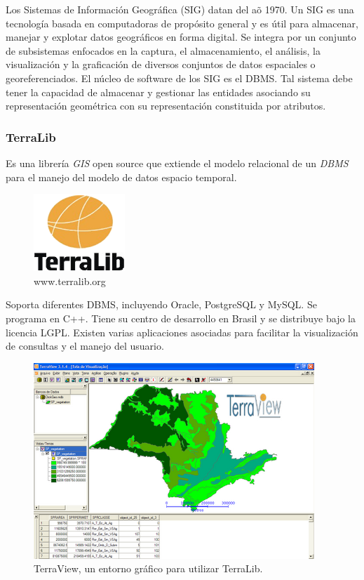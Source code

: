 \documentclass[a4paper,12pt,oneside]{report}
\begin{document}
Los Sistemas de Informaci\'on Geogr\'afica (SIG) datan del a\~o 1970. Un SIG es una tecnolog\'ia basada en computadoras de prop\'osito general y es \'util para almacenar, manejar y explotar datos geogr\'aficos en forma digital. Se integra por un conjunto de subsistemas enfocados en la captura, el almacenamiento, el an\'alisis, la visualizaci\'on y la graficaci\'on de diversos conjuntos de datos espaciales o georeferenciados. El n\'ucleo de software de los SIG es el DBMS. Tal sistema debe tener la capacidad de almacenar y gestionar las entidades asociando su representaci\'on geom\'etrica con su representaci\'on constituida por atributos.

\subsubsection*{TerraLib}
Es una librer\'ia \textit{GIS} open source que extiende el modelo relacional de un \textit{DBMS} para el manejo del modelo de datos espacio temporal.
\begin{figure}[h]
\begin{center}
\includegraphics[scale=0.6]{images/terralib.png}
\caption{www.terralib.org}
\end{center}
\end{figure}

\noindent Soporta diferentes DBMS, incluyendo Oracle, PostgreSQL y MySQL. Se programa en C++. Tiene su centro de desarrollo en Brasil y se distribuye bajo la licencia LGPL. Existen varias aplicaciones asociadas para facilitar la visualizaci\'on de consultas y el manejo del usuario.

\begin{figure}[h]
\centering
\includegraphics[scale=0.6]{images/terraview.png}
\caption{TerraView, un entorno gr\'afico para utilizar TerraLib.}
\end{figure}
\end{document}
